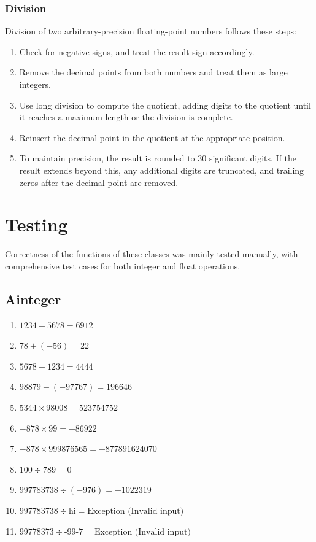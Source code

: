 \documentclass[12pt]{article}
\begin{document}
\subsubsection{Division}
Division of two arbitrary-precision floating-point numbers follows these steps:
\begin{enumerate}
    \item Check for negative signs, and treat the result sign accordingly.
    \item Remove the decimal points from both numbers and treat them as large integers.
    \item Use long division to compute the quotient, adding digits to the quotient until it reaches a maximum length or the division is complete.
    \item Reinsert the decimal point in the quotient at the appropriate position.
    \item To maintain precision, the result is rounded to 30 significant digits. If the result extends beyond this, any additional digits are truncated, and trailing zeros after the decimal point are removed.
\end{enumerate}

\section{Testing}

Correctness of the functions of these classes was mainly tested manually, with comprehensive test cases for both integer and float operations.
\subsection{Ainteger}
\begin{enumerate}
    \item \(1234 + 5678 = 6912\)
    \item \(78 + (-56) = 22\)
    \item \(5678 - 1234 = 4444\)
    \item \(98879 - (-97767) = 196646\)
    \item \(5344 \times 98008 = 523754752\)
    \item \(-878 \times 99 = -86922\)
    \item \(-878 \times 999876565 = -877891624070\)
    \item \(100 \div 789 = 0\)
    \item \(997783738 \div (-976) = -1022319\)
    \item \(997783738 \div \text{hi} = \text{Exception (Invalid input)}\)
    \item \(99778373 \div \text{-99-7} = \text{Exception (Invalid input)}\)
\end{enumerate}
\end{document}
